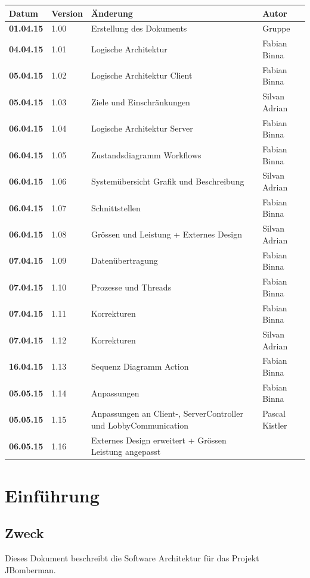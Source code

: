 \documentclass[11pt]{scrartcl}
\begin{document}
\begin{tabularx}{\linewidth}{l l X l}
\textbf{Datum} & \textbf{Version} & \textbf{Änderung}  & \textbf{Autor} \\
\hline
\textbf{01.04.15} & 1.00 & Erstellung des Dokuments & Gruppe \\
\textbf{04.04.15} & 1.01 & Logische Architektur & Fabian Binna \\
\textbf{05.04.15} & 1.02 & Logische Architektur Client & Fabian Binna\\
\textbf{05.04.15} & 1.03 & Ziele und Einschränkungen & Silvan Adrian\\
\textbf{06.04.15} & 1.04 & Logische Architektur Server & Fabian Binna\\
\textbf{06.04.15} & 1.05 & Zustandsdiagramm Workflows & Fabian Binna\\
\textbf{06.04.15} & 1.06 & Systemübersicht Grafik und Beschreibung & Silvan Adrian\\
\textbf{06.04.15} & 1.07 & Schnittstellen & Fabian Binna\\
\textbf{06.04.15} & 1.08 & Grössen und Leistung + Externes Design & Silvan Adrian\\
\textbf{07.04.15} & 1.09 & Datenübertragung & Fabian Binna\\
\textbf{07.04.15} & 1.10 & Prozesse und Threads & Fabian Binna\\
\textbf{07.04.15} & 1.11 & Korrekturen & Fabian Binna\\
\textbf{07.04.15} & 1.12 & Korrekturen & Silvan Adrian\\
\textbf{16.04.15} & 1.13 & Sequenz Diagramm Action & Fabian Binna\\
\textbf{05.05.15} & 1.14 & Anpassungen & Fabian Binna\\
\bf{05.05.15} & 1.15 & Anpassungen an Client-, ServerController und LobbyCommunication 
& Pascal Kistler\\
\bf{06.05.15} & 1.16 & Externes Design erweitert + Grössen Leistung angepasst\\
\end{tabularx}

\newpage
\tableofcontents
\newpage

\section{Einführung}
\subsection{Zweck}
Dieses Dokument beschreibt die Software Architektur für das Projekt JBomberman.
\end{document}
